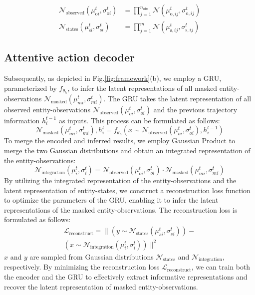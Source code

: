 \begin{equation}
\begin{split}
\mathcal{N}_{\mathrm{observed}}(\mu_{\mathrm{o}i}^t,\sigma_{\mathrm{o}i}^t)&=\prod_{j=1}^{n_{\mathrm{obs}}}\mathcal{N}(\mu_{\mathrm{o},ij}^t,\sigma_{\mathrm{o},ij}^t)\\
\mathcal{N}_{\mathrm{states}}(\mu_{\mathrm{s}i}^t,\sigma_{\mathrm{s}i}^t)&=\prod_{j=1}^m\mathcal{N}(\mu_{\mathrm{s},ij}^t,\sigma_{\mathrm{s},ij}^t)
\label{eq:(3)}
\end{split}
\end{equation}

\subsection{Attentive action decoder}
Subsequently, as depicted in Fig.\ref{fig:framework}(b), we employ a GRU, parameterized by $f_{\theta_h}$, to infer the latent representations of all masked entity-observations $\mathcal{N}_{\mathrm{masked}}(\mu_{mi}^t, \sigma_{mi}^t)$. The GRU takes the latent representation of all observed entity-observations $\mathcal{N}_{\mathrm{observed}}(\mu_{oi}^t, \sigma_{oi}^t)$ and the previous trajectory information $h_i^{t-1}$ as inputs. This process can be formulated as follows:
\begin{equation}
    \mathcal{N}_{\mathrm{masked}}(\mu_{mi}^t, \sigma_{mi}^t), h_i^t=f_{\theta_h}(x \sim \mathcal{N}_{\mathrm{observed}}(\mu_{oi}^t,\sigma_{oi}^t),h_i^{t-1})
    \label{eq:(4)}
\end{equation}
To merge the encoded and inferred results, we employ Gaussian Product to merge the two Gaussian distributions and obtain an integrated representation of the entity-observations:
\begin{equation}
        \mathcal{N}_{\mathrm{integration}}(\mu_{i}^t,\sigma_{i}^t)=\mathcal{N}_{\mathrm{observed}}(\mu_{oi}^t,\sigma_{oi}^t)\cdot\mathcal{N}_{\mathrm{masked}}(\mu_{mi}^t, \sigma_{mi}^t)
    \label{eq:(5)}
\end{equation}
By utilizing the integrated representation of the entity-observations and the latent representation of entity-states, we construct a reconstruction loss function to optimize the parameters of the GRU, enabling it to infer the latent representations of the masked entity-observations. The reconstruction loss is formulated as follows:
\begin{equation}
\begin{split}
\mathcal{L}_{\mathrm{reconstruct}}=\|(y \sim \mathcal{N}_{\mathrm{states}}(\mu_{si}^t,\sigma_{si}^t))-\\
(x \sim \mathcal{N}_{\mathrm{integration}}(\mu_{i}^t,\sigma_{i}^t))\|^2
\end{split}
\label{eq:(6)}
\end{equation}
$x$ and $y$ are sampled from Gaussian distributions $\mathcal{N}_{\mathrm{states}}$ and $\mathcal{N}_{\mathrm{integration}}$, respectively. By minimizing the reconstruction loss $\mathcal{L}_{\mathrm{reconstruct}}$, we can train both the encoder and the GRU to effectively extract informative representations and recover the latent representation of masked entity-observations.

